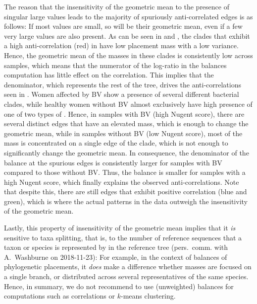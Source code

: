 The reason that the insensitivity of the geometric mean to the presence of singular large values
leads to the majority of spuriously anti-correlated edges is as follows:
If most values are small, so will be their geometric mean, even if a few very large values are also present.
As can be seen in  and ,
the clades that exhibit a high anti-correlation (red) in 
have low placement mass with a low variance.
Hence, the geometric mean of the masses in these clades is consistently low across samples,
which means that the numerator of the log-ratio in the balances computation has little effect on the correlation.
This implies that the denominator, which represents the rest of the tree,
drives the anti-correlations seen in .
Women affected by \ac{BV} show a presence of several different bacterial clades,
while healthy women without \ac{BV} almost exclusively have high presence
of one of two types of  \cite{Srinivasan2012}.
Hence, in samples with \ac{BV} (high Nugent score), there are several distinct edges that have an elevated mass,
which is enough to change the geometric mean,
while in samples without \ac{BV} (low Nugent score),
most of the mass is concentrated on a single edge of the  clade,
which is not enough to significantly change the geometric mean.
In consequence, the denominator of the balance at the spurious edges is consistently larger
for samples with \ac{BV} compared to those without \ac{BV}.
Thus, the balance is smaller for samples with a high Nugent score,
which finally explains the observed anti-correlations.
Note that despite this, there are still edges that exhibit positive correlation (blue and green),
which is where the actual patterns in the data outweigh the insensitivity of the geometric mean.

Lastly, this property of insensitivity of the geometric mean implies that it \emph{is} sensitive to taxa splitting,
that is, to the number of reference sequences that a taxon or species is represented by in the reference tree
(pers.~comm. with A.~Washburne on 2018-11-23):
For example, in the context of balances of phylogenetic placements,
it \emph{does} make a difference whether masses are focused on a single branch,
or distributed across several representatives of the same species.
Hence, in summary,
we do not recommend to use (unweighted) balances for computations such as correlations or $k$-means clustering.

